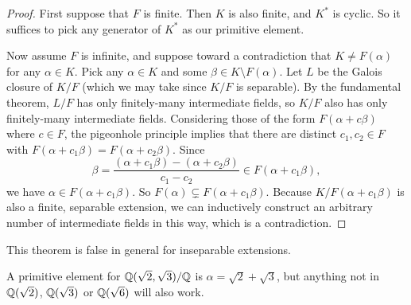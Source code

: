 \begin{proof}
    First suppose that $F$ is finite. Then $K$ is also finite, and $K^*$ is cyclic. So it suffices to pick any generator of $K^*$ as our primitive element.
    
    Now assume $F$ is infinite, and suppose toward a contradiction that $K \neq F(\alpha)$ for any $\alpha \in K$. Pick any $\alpha \in K$ and some $\beta \in K \setminus F(\alpha)$. Let $L$ be the Galois closure of $K/F$ (which we may take since $K/F$ is separable). By the fundamental theorem, $L/F$ has only finitely-many intermediate fields, so $K/F$ also has only finitely-many intermediate fields. Considering those of the form $F(\alpha + c\beta)$ where $c \in F$, the pigeonhole principle implies that there are distinct $c_1, c_2 \in F$ with $F(\alpha + c_1\beta) = F(\alpha + c_2\beta)$. Since
    \[
        \beta = \frac{(\alpha + c_1 \beta) - (\alpha + c_2 \beta)}{c_1 - c_2} \in F(\alpha + c_1 \beta),
    \]
    we have $\alpha \in F(\alpha + c_1 \beta)$. So $F(\alpha) \subsetneq F(\alpha + c_1 \beta)$. Because $K/F(\alpha + c_1 \beta)$ is also a finite, separable extension, we can inductively construct an arbitrary number of intermediate fields in this way, which is a contradiction.
\end{proof}

\begin{remark}
    This theorem is false in general for inseparable extensions.
\end{remark}

\begin{example}
    A primitive element for $\mathbb{{Q}}(\sqrt{2}, \sqrt{3})/\mathbb{{Q}}$ is $\alpha = \sqrt{2} + \sqrt{3}$, but anything not in $\mathbb{{Q}}(\sqrt{2})$, $\mathbb{{Q}}(\sqrt{3})$ or $\mathbb{{Q}}(\sqrt{6})$ will also work.
\end{example}
